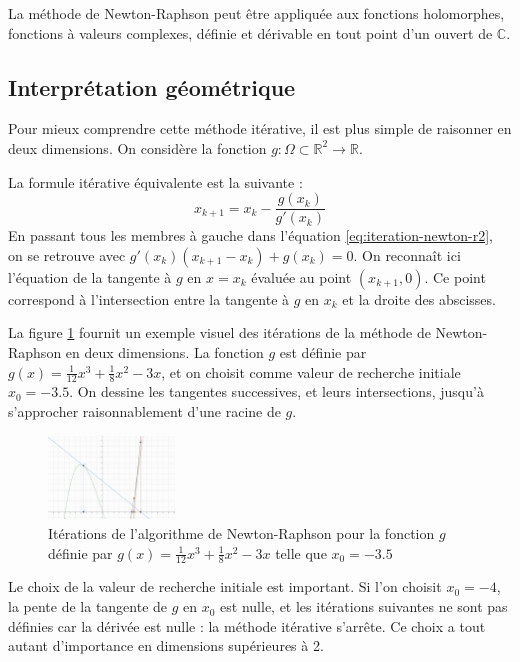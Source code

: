 \documentclass[3p, twocolumn]{elsarticle}
\begin{document}
\begin{rmk}
    La méthode de Newton-Raphson peut être appliquée aux fonctions holomorphes, fonctions à valeurs complexes, définie et dérivable en tout point d'un ouvert de $\mathbb{C}$.
\end{rmk}

\subsection{Interprétation géométrique}
Pour mieux comprendre cette méthode itérative, il est plus simple de raisonner en deux dimensions. On considère la fonction $g :\Omega\subset\mathbb R^2 \rightarrow \mathbb R$.

La formule itérative équivalente est la suivante :
\begin{equation}
    x_{k+1}=x_k-\frac{g(x_k)}{g'(x_k)}
    \label{eq:iteration-newton-r2}
\end{equation}
En passant tous les membres à gauche dans l'équation \ref{eq:iteration-newton-r2}, on se retrouve avec $g'(x_k)(x_{k+1}-x_k)+g(x_k)=0$. On reconnaît ici l'équation de la tangente à $g$ en $x=x_k$ évaluée au point $(x_{k+1},0)$.
Ce point correspond à l'intersection entre la tangente à $g$ en $x_k$ et la droite des abscisses.

La figure \ref{fig:nr-iterations-1} fournit un exemple visuel des itérations de la méthode de Newton-Raphson en deux dimensions. La fonction $g$ est définie par $g(x)=\frac{1}{12}x^3+\frac18x^2-3x$, et on choisit comme valeur de recherche initiale $x_0=-3.5$. On dessine les tangentes successives, et leurs intersections, jusqu'à s'approcher raisonnablement d'une racine de $g$.

\begin{figure}[htbp]
    \centering
    \includegraphics[width = 0.3\textwidth]{iteration-newton-1.png}
    \caption{Itérations de l'algorithme de Newton-Raphson pour la fonction $g$ définie par $g(x)=\frac{1}{12}x^3+\frac18x^2-3x$ telle que $x_0=-3.5$}
    \label{fig:nr-iterations-1}
\end{figure}

\begin{rmk}
    Le choix de la valeur de recherche initiale est important. Si l'on choisit $x_0=-4$, la pente de la tangente de $g$ en $x_0$ est nulle, et les itérations suivantes ne sont pas définies car la dérivée est nulle : la méthode itérative s'arrête. Ce choix a tout autant d'importance en dimensions supérieures à 2.
\end{rmk}
\end{document}
